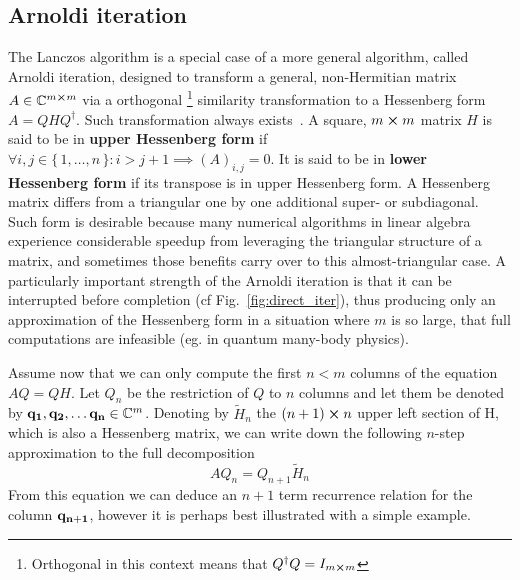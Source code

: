 \subsection{Arnoldi iteration}
The Lanczos algorithm is a special case of a more general algorithm, called Arnoldi iteration, designed to transform
a general, non-Hermitian matrix \(A\in \mathbb{C}^{m\cross m} \) via a orthogonal
\footnote{Orthogonal in this context means that \(Q^{\dagger}Q = I_{m \cross m}\)} similarity transformation to a Hessenberg form \(A = QHQ^{\dagger}\).
Such transformation always exists~\autocite {Garcia2017}. A square, \(m \cross m\) matrix \(H\) is said to be
in \textbf{upper Hessenberg form} if \(\forall i,j\in \{\,1,\ldots,n\,\}: i > j+1 \implies (A)_{i,j}=0 \).
It is said to be in \textbf{lower Hessenberg form} if its transpose is in upper Hessenberg form.
A Hessenberg matrix differs from a triangular one by one additional super- or subdiagonal.
Such form is desirable because many numerical algorithms in linear algebra experience considerable speedup
from leveraging the triangular structure of a matrix, and sometimes those benefits carry over to this almost-triangular
case. A particularly important strength of the Arnoldi iteration is that it can be interrupted before completion (cf Fig.~\ref{fig:direct_iter}),
thus producing only an approximation of the Hessenberg form in a situation where \(m\) is so large, that
full computations are infeasible (eg. in quantum many-body physics).

Assume now that we can only compute the first \(n < m\) columns of the equation \(AQ=QH\).
Let \(Q_n\) be the restriction of \(Q\) to \(n\) columns and let them be denoted by \(\vectorbold{q_1},\vectorbold{q_2}, \ldots
\vectorbold{ q_n}\in \CC^m\).
Denoting by \(\tilde{H}_n\) the \((n+1)\cross n\) upper left section of H, which is also a Hessenberg matrix, we can
write down the following \(n\)-step approximation to the full decomposition
\begin{equation}
	AQ_{n}=Q_{n+1}\tilde{H}_{n}
	\label{eq:krylov_n_approx}
\end{equation}
From this equation we can deduce an \(n+1\) term recurrence relation for the column \(\vectorbold{q_{n+1}}\), however
it is perhaps best illustrated with a simple example.

